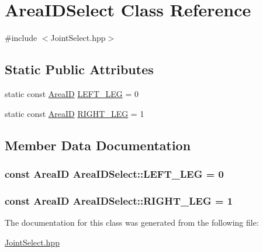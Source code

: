 \hypertarget{classAreaIDSelect}{}\section{Area\+I\+D\+Select Class Reference}
\label{classAreaIDSelect}


{\ttfamily \#include $<$Joint\+Select.\+hpp$>$}

\subsection*{Static Public Attributes}
\begin{DoxyCompactItemize}
\item 
static const \hyperlink{JointSelect_8hpp_a0b0b6279ef5d4a446f8f07404dc868d3}{Area\+ID} \hyperlink{classAreaIDSelect_a4df58116b3d3e37c36782251a507c81f}{L\+E\+F\+T\+\_\+\+L\+EG} = 0
\item 
static const \hyperlink{JointSelect_8hpp_a0b0b6279ef5d4a446f8f07404dc868d3}{Area\+ID} \hyperlink{classAreaIDSelect_af3ad34b4529935bf925bcc668a351a02}{R\+I\+G\+H\+T\+\_\+\+L\+EG} = 1
\end{DoxyCompactItemize}


\subsection{Member Data Documentation}
\subsubsection[{\texorpdfstring{L\+E\+F\+T\+\_\+\+L\+EG}{LEFT_LEG}}]{\setlength{\rightskip}{0pt plus 5cm}const {\bf Area\+ID} Area\+I\+D\+Select\+::\+L\+E\+F\+T\+\_\+\+L\+EG = 0\hspace{0.3cm}{\ttfamily [static]}}\hypertarget{classAreaIDSelect_a4df58116b3d3e37c36782251a507c81f}{}\label{classAreaIDSelect_a4df58116b3d3e37c36782251a507c81f}
\subsubsection[{\texorpdfstring{R\+I\+G\+H\+T\+\_\+\+L\+EG}{RIGHT_LEG}}]{\setlength{\rightskip}{0pt plus 5cm}const {\bf Area\+ID} Area\+I\+D\+Select\+::\+R\+I\+G\+H\+T\+\_\+\+L\+EG = 1\hspace{0.3cm}{\ttfamily [static]}}\hypertarget{classAreaIDSelect_af3ad34b4529935bf925bcc668a351a02}{}\label{classAreaIDSelect_af3ad34b4529935bf925bcc668a351a02}


The documentation for this class was generated from the following file\+:\begin{DoxyCompactItemize}
\item 
\hyperlink{JointSelect_8hpp}{Joint\+Select.\+hpp}\end{DoxyCompactItemize}
